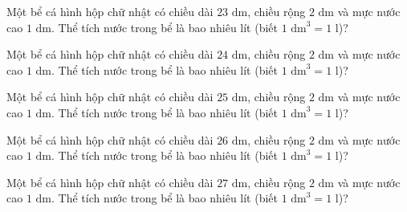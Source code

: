 \begin{ex}
  Một bể cá hình hộp chữ nhật có chiều dài $23\text{ dm}$, chiều rộng $2\text{ dm}$ và mực nước cao $1\text{ dm}$. Thể tích nước trong bể là bao nhiêu lít (biết $1\text{ dm}^3 = 1\text{ l}$)?
\end{ex}

\begin{ex}
  Một bể cá hình hộp chữ nhật có chiều dài $24\text{ dm}$, chiều rộng $2\text{ dm}$ và mực nước cao $1\text{ dm}$. Thể tích nước trong bể là bao nhiêu lít (biết $1\text{ dm}^3 = 1\text{ l}$)?
\end{ex}

\begin{ex}
  Một bể cá hình hộp chữ nhật có chiều dài $25\text{ dm}$, chiều rộng $2\text{ dm}$ và mực nước cao $1\text{ dm}$. Thể tích nước trong bể là bao nhiêu lít (biết $1\text{ dm}^3 = 1\text{ l}$)?
\end{ex}

\begin{ex}
  Một bể cá hình hộp chữ nhật có chiều dài $26\text{ dm}$, chiều rộng $2\text{ dm}$ và mực nước cao $1\text{ dm}$. Thể tích nước trong bể là bao nhiêu lít (biết $1\text{ dm}^3 = 1\text{ l}$)?
\end{ex}

\begin{ex}
  Một bể cá hình hộp chữ nhật có chiều dài $27\text{ dm}$, chiều rộng $2\text{ dm}$ và mực nước cao $1\text{ dm}$. Thể tích nước trong bể là bao nhiêu lít (biết $1\text{ dm}^3 = 1\text{ l}$)?
\end{ex}
